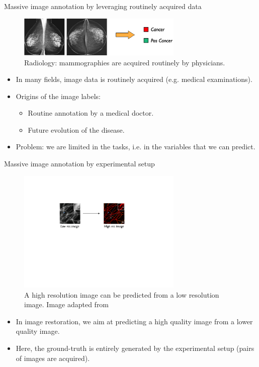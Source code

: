 \documentclass[xcolor=pdftex,dvipsnames,table]{beamer}
\begin{document}
\begin{frame}{Massive image annotation by leveraging routinely acquired data}
\begin{figure}[htb]
   \centering
   \includegraphics[width=0.7\textwidth]{../graphics/radiology.pdf}
   \caption{Radiology: mammographies are acquired routinely by physicians.}
\end{figure}
\begin{itemize}
   \item In many fields, image data is routinely acquired (e.g. medical examinations). 
   \item Origins of the image labels:
   \begin{itemize}
      \item Routine annotation by a medical doctor.
      \item Future evolution of the disease.
   \end{itemize}
   \item Problem: we are limited in the tasks, i.e. in the variables that we can predict. 
\end{itemize}
\end{frame}

\begin{frame}{Massive image annotation by experimental setup}
\begin{figure}[htb]
   \centering
   \includegraphics[width=0.7\textwidth]{../graphics/super_resolution.pdf}
   \caption{A high resolution image can be predicted from a low resolution image. Image adapted from \cite{Ouyang2018}}
\end{figure}
\begin{itemize}
   \item In image restoration, we aim at predicting a high quality image from a lower quality image. 
   \item Here, the ground-truth is entirely generated by the experimental setup (pairs of images are acquired). 
\end{itemize}
\end{frame}
\end{document}
